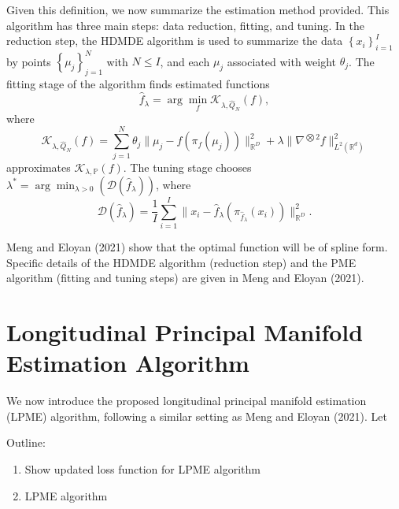 \documentclass[11pt,reqno]{article}
\begin{document}
Given this definition, we now summarize the estimation method provided. This algorithm has three main steps: data reduction, fitting, and tuning. In the reduction step, the HDMDE algorithm is used to summarize the data $\left\{x_i\right\}_{i=1}^{I}$ by points $\left\{\mu_j\right\}_{j=1}^{N}$ with $N \leq I$, and each $\mu_j$ associated with weight $\theta_j$. The fitting stage of the algorithm finds estimated functions 
\[%
  \hat{f}_\lambda = \arg\min_f \mathcal{K}_{\lambda, \hat{Q}_N}(f)
,\]%
where 
\[%
  \mathcal{K}_{\lambda, \hat{Q}_N}(f) = \sum_{j = 1}^{N}\theta_j \|\mu_j - f(\pi_f(\mu_j))\|_{\mathbb{R}^{D}}^2 + \lambda\|\nabla^{\bigotimes 2}f\|_{L^2(\mathbb{R}^{d})}^2
\]%
approximates $\mathcal{K}_{\lambda, \mathbb{P}}(f)$. The tuning stage chooses $\lambda^{*} = \arg\min_{\lambda > 0}(\mathcal{D}(\hat{f}_\lambda))$, where 
\[%
  \mathcal{D}(\hat{f}_\lambda) = \frac{1}{I}\sum_{i=1}^{I}\|x_i - \hat{f}_\lambda(\pi_{\hat{f}_\lambda}(x_i))\|_{\mathbb{R}^{D}}^2
.\]%

Meng and Eloyan (2021) show that the optimal function will be of spline form. Specific details of the HDMDE algorithm (reduction step) and the PME algorithm (fitting and tuning steps) are given in Meng and Eloyan (2021).

\section{Longitudinal Principal Manifold Estimation Algorithm}

We now introduce the proposed longitudinal principal manifold estimation (LPME) algorithm, following a similar setting as Meng and Eloyan (2021). Let 

Outline:
\begin{enumerate}
    \item Show updated loss function for LPME algorithm
    \item LPME algorithm
\end{enumerate}

\LinesNumbered

\end{document}
